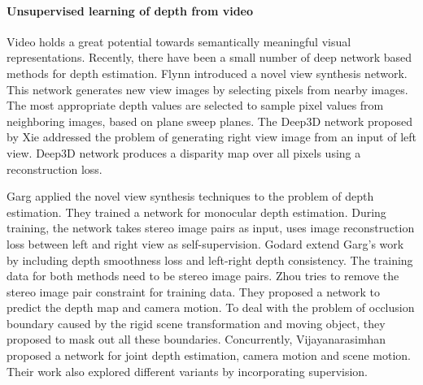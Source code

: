 \paragraph{Unsupervised learning of depth from video}
Video holds a great potential towards semantically meaningful visual representations. Recently, there have been a small number of deep network based methods for depth estimation. Flynn \etal \cite{flynn2016deepstereo} introduced a novel view synthesis network. This network generates new view images by selecting pixels from nearby images. The most appropriate depth values are selected to sample pixel values from neighboring images, based on plane sweep planes. The Deep3D network proposed by Xie \etal \cite{xie2016deep3d} addressed the problem of generating right view image from an input of left view. Deep3D network produces a disparity map over all pixels using a reconstruction loss.

Garg \etal \cite{GargBR16} applied the novel view synthesis techniques to the problem of depth estimation. They trained a network for monocular depth estimation. During training, the network takes stereo image pairs as input, uses image reconstruction loss between left and right view as self-supervision. Godard \etal \cite{godard2016unsupervised} extend Garg's work by including depth smoothness loss and left-right depth consistency. The training data for both methods need to be stereo image pairs. Zhou \etal \cite{zhou2017unsupervised} tries to remove the stereo image pair constraint for training data. They proposed a network to predict the depth map and camera motion. To deal with the problem of occlusion boundary caused by the rigid scene transformation and moving object, they proposed to mask out all these boundaries. Concurrently, Vijayanarasimhan \etal \cite{kuznietsov2017semi} proposed a network for joint depth estimation, camera motion and scene motion. Their work also explored different variants by incorporating supervision. 
